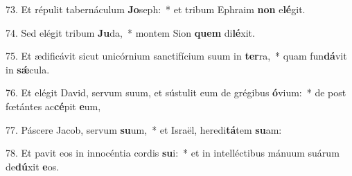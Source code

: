 73. Et répulit tabernáculum \textbf{Jo}seph:~*  et tribum Ephraim \textbf{non} e\textbf{lé}git.\

74. Sed elégit tribum \textbf{Ju}da,~*  montem Sion \textbf{quem} di\textbf{lé}xit.\

75. Et ædificávit sicut unicórnium sanctifícium suum in \textbf{ter}ra,~*  quam fun\textbf{dá}vit in \textbf{sǽ}cula.\

76. Et elégit David, servum suum, et sústulit eum de grégibus \textbf{ó}vium:~*  de post fœtántes ac\textbf{cé}pit \textbf{e}um,\

77. Páscere Jacob, servum \textbf{su}um,~*  et Israël, heredi\textbf{tá}tem \textbf{su}am:\

78. Et pavit eos in innocéntia cordis \textbf{su}i:~*  et in intelléctibus mánuum suárum de\textbf{dú}xit \textbf{e}os.\

